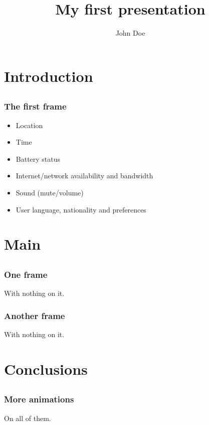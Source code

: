 \documentclass{beamer}
\title{My first presentation}
\author{John Doe}
\institute{City University}
\begin{document}
\maketitle

\section{Introduction}
\subsection{}

\begin{frame}
\frametitle{The first frame}
\begin{itemize}
\item Location \pause
\item Time \pause
\item Battery status \pause
\item Internet/network availability and bandwidth \pause
\item Sound (mute/volume) \pause
\item User language, nationality and preferences
\end{itemize}
\end{frame}

\section{Main}
\subsection{}

\begin{frame}
\frametitle{One frame}
With nothing on it.
\end{frame}

\begin{frame}
\frametitle{Another frame}
With nothing on it.
\end{frame}

\section{Conclusions}
\subsection{}

\begin{frame}
\frametitle{More animations}
On all of them.
\end{frame}
\end{document}

